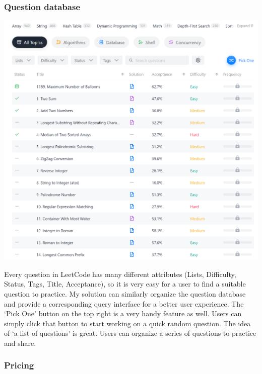 \documentclass[a4paper]{report}
\begin{document}
\subsubsection{Question database}

\includegraphics[width=\linewidth]{LeetCode-Problems}

Every question in LeetCode has many different attributes (Lists, Difficulty, Status, Tags, Title, Acceptance), so it is very easy for a user to find a suitable question to practice. My solution can similarly organize the question database and provide a corresponding query interface for a better user experience. The `Pick One' button on the top right is a very handy feature as well. Users can simply click that button to start working on a quick random question. The idea of `a list of questions' is great. Users can organize a series of questions to practice and share.

\subsubsection{Pricing}
\end{document}
